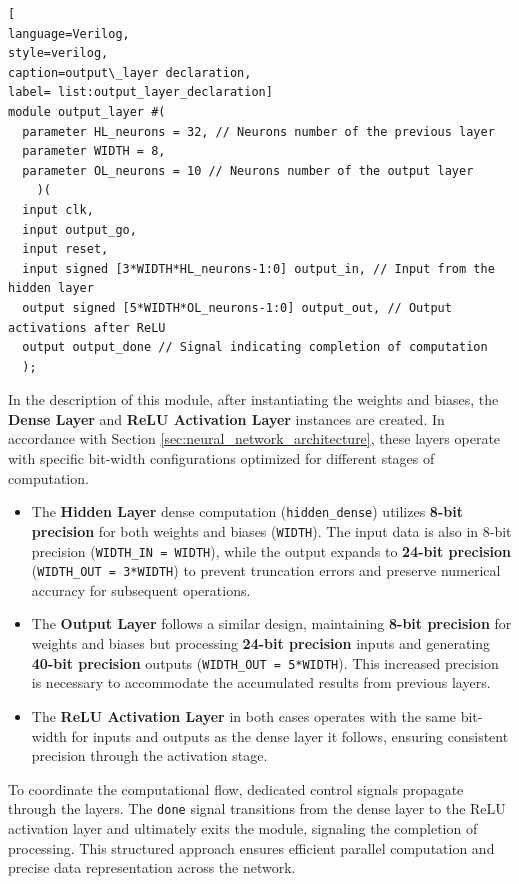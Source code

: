 \documentclass[11pt]{report}
\begin{document}
\begin{lstlisting}[
language=Verilog,
style=verilog,
caption=output\_layer declaration,
label= list:output_layer_declaration]
module output_layer #(
  parameter HL_neurons = 32, // Neurons number of the previous layer
  parameter WIDTH = 8,
  parameter OL_neurons = 10 // Neurons number of the output layer
	)(
  input clk,
  input output_go,
  input reset,
  input signed [3*WIDTH*HL_neurons-1:0] output_in, // Input from the hidden layer
  output signed [5*WIDTH*OL_neurons-1:0] output_out, // Output activations after ReLU
  output output_done // Signal indicating completion of computation
  );
\end{lstlisting}

In the description of this module, after instantiating the weights and biases, the \textbf{Dense Layer} and \textbf{ReLU Activation Layer} instances are created. In accordance with Section \ref{sec:neural_network_architecture}, these layers operate with specific bit-width configurations optimized for different stages of computation.

\begin{itemize}
    \item The \textbf{Hidden Layer} dense computation (\texttt{hidden\_dense}) utilizes \textbf{8-bit precision} for both weights and biases (\texttt{WIDTH}). The input data is also in 8-bit precision (\texttt{WIDTH\_IN = WIDTH}), while the output expands to \textbf{24-bit precision} (\texttt{WIDTH\_OUT = 3*WIDTH}) to prevent truncation errors and preserve numerical accuracy for subsequent operations.
    \item The \textbf{Output Layer} follows a similar design, maintaining \textbf{8-bit precision} for weights and biases but processing \textbf{24-bit precision} inputs and generating \textbf{40-bit precision} outputs (\texttt{WIDTH\_OUT = 5*WIDTH}). This increased precision is necessary to accommodate the accumulated results from previous layers.
    \item The \textbf{ReLU Activation Layer} in both cases operates with the same bit-width for inputs and outputs as the dense layer it follows, ensuring consistent precision through the activation stage.
\end{itemize}

To coordinate the computational flow, dedicated control signals propagate through the layers. The \texttt{done} signal transitions from the dense layer to the ReLU activation layer and ultimately exits the module, signaling the completion of processing. This structured approach ensures efficient parallel computation and precise data representation across the network.  
\end{document}

